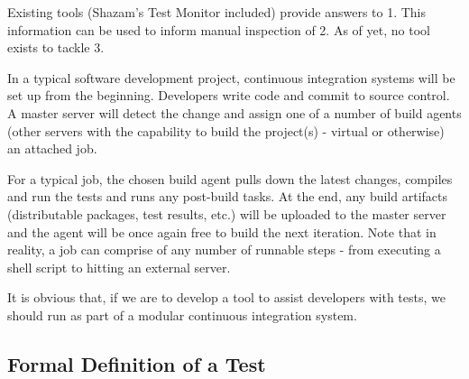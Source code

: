 Existing tools (Shazam’s \flaky{} Test Monitor included) provide answers to 1. This information can be used to inform manual inspection of 2. As of yet, no tool exists to tackle 3.

In a typical software development project, continuous integration systems will be set up from the beginning. Developers write code and commit to source control. A master server will detect the change and assign one of a number of build agents (other servers with the capability to build the project(s) - virtual or otherwise) an attached job.

For a typical job, the chosen build agent pulls down the latest changes, compiles and run the tests and runs any post-build tasks. At the end, any build artifacts (distributable packages, test results, etc.) will be uploaded to the master server and the agent will be once again free to build the next iteration. Note that in reality, a job can comprise of any number of runnable steps - from executing a shell script to hitting an external server.


It is obvious that, if we are to develop a tool to assist developers with \flaky{} tests, we should run as part of a modular continuous integration system.


\subsection{Formal Definition of a \flaky{} Test}

\theoremstyle{definition}
\newtheorem{defn}{Definition}[section]


